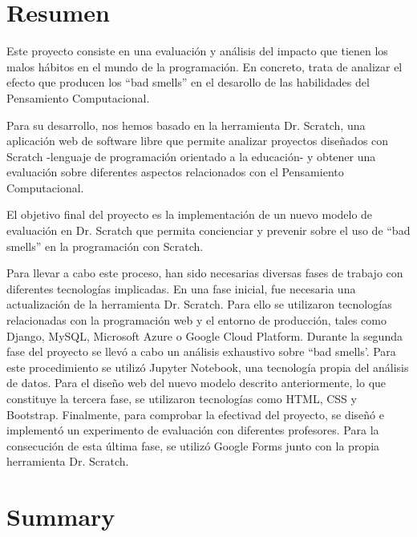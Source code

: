 

\chapter*{Resumen}

Este proyecto consiste en una evaluación y análisis del impacto que tienen los malos hábitos en el mundo de la programación. En concreto, trata de analizar el efecto que producen los ``bad smells'' en el desarollo de las habilidades del Pensamiento Computacional.  

Para su desarrollo, nos hemos basado en la herramienta Dr. Scratch, una aplicación web de software libre que permite analizar proyectos diseñados con Scratch -lenguaje de programación orientado a la educación- y obtener una evaluación sobre diferentes aspectos relacionados con el Pensamiento Computacional.

El objetivo final del proyecto es la implementación de un nuevo modelo de evaluación en Dr. Scratch que permita concienciar y prevenir sobre el uso de ``bad smells'' en la programación con Scratch. 

Para llevar a cabo este proceso, han sido necesarias diversas fases de trabajo con diferentes tecnologías implicadas. En una fase inicial, fue necesaria una actualización de la herramienta Dr. Scratch. Para ello se utilizaron tecnologías relacionadas con la programación web y el entorno de producción, tales como Django, MySQL, Microsoft Azure o Google Cloud Platform. Durante la segunda fase del proyecto se llevó a cabo un análisis exhaustivo sobre ``bad smells'. Para este procedimiento se utilizó Jupyter Notebook, una tecnología propia del análisis de datos. Para el diseño web del nuevo modelo descrito anteriormente, lo que constituye la tercera fase, se utilizaron tecnologías como HTML, CSS y Bootstrap. Finalmente, para comprobar la efectivad del proyecto, se diseñó e implementó un experimento de evaluación con diferentes profesores. Para la consecución de esta última fase, se utilizó Google Forms junto con la propia herramienta Dr. Scratch.



\chapter*{Summary}


